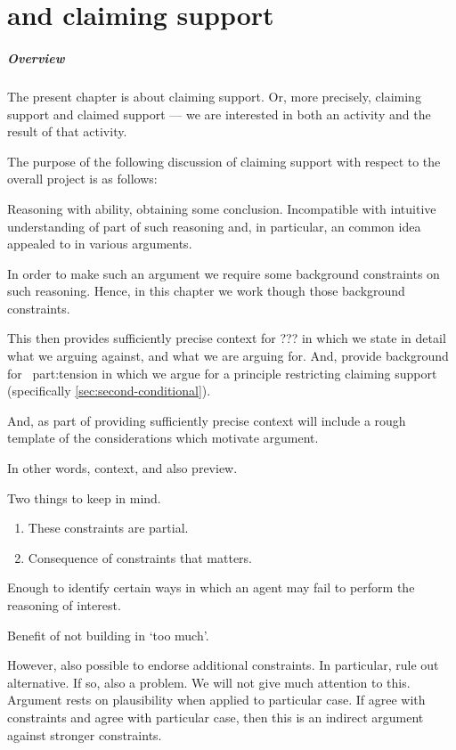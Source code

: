 \chapter{ and claiming support}
\label{cha:claiming-support}

\paragraph*{Overview}

\begin{note}
  The present chapter is about claiming support.
  Or, more precisely, claiming support and claimed support --- we are interested in both an activity and the result of that activity.

  The purpose of the following discussion of claiming support with respect to the {\color{red} overall project} is as follows:

  Reasoning with ability, obtaining some conclusion.
  Incompatible with intuitive understanding of part of such reasoning and, in particular, an common idea appealed to in various arguments.

  In order to make such an argument we require some background constraints on such reasoning.
  Hence, in this chapter we work though those background constraints.

  This then provides sufficiently precise context for {\color{red} ???} in which we state in detail what we arguing against, and what we are arguing for.
  And, provide background for~{\color{red} part:tension} in which we argue for a principle restricting claiming support (specifically \autoref{sec:second-conditional}).

  And, as part of providing sufficiently precise context will include a rough template of the considerations which motivate argument.

  In other words, context, and also preview.
\end{note}

\begin{note}
  Two things to keep in mind.

  \begin{enumerate}
  \item These constraints are partial.
  \item Consequence of constraints that matters.
  \end{enumerate}

  Enough to identify certain ways in which an agent may fail to perform the reasoning of interest.

  Benefit of not building in `too much'.

  However, also possible to endorse additional constraints.
  In particular, rule out alternative.
  If so, also a problem.
  We will not give much attention to this.
  Argument rests on plausibility when applied to particular case.
  If agree with constraints and agree with particular case, then this is an indirect argument against stronger constraints.
\end{note}

